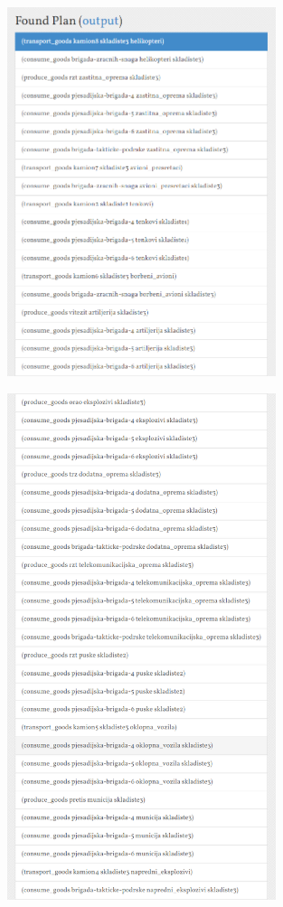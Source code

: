 \documentclass{article}
\begin{document}
\begin{figure}[H]
  \centering
  \includegraphics[width=0.7\textwidth]{Plan3_1}
\end{figure}

\clearpage
\begin{figure}[H]
  \centering
  \includegraphics[width=0.7\textwidth]{Plan3_2}
\end{figure}
\end{document}
